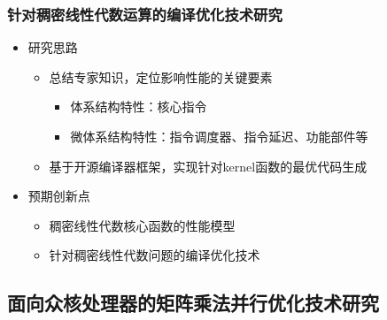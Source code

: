 \documentclass[aspectratio=169]{beamer}
\begin{document}
\begin{frame}
  \frametitle{针对稠密线性代数运算的编译优化技术研究}
  \begin{itemize}
  \item 研究思路
    \begin{itemize}
    \item 总结专家知识，定位影响性能的关键要素
      \begin{itemize}
      \item 体系结构特性：核心指令
      \item 微体系结构特性：指令调度器、指令延迟、功能部件等
      \end{itemize}
    \item 基于开源编译器框架，实现针对kernel函数的最优代码生成
    \end{itemize}
  \item 预期创新点
    \begin{itemize}
    \item 稠密线性代数核心函数的性能模型
    \item 针对稠密线性代数问题的编译优化技术
    \end{itemize}
  \end{itemize}
\end{frame}

\subsection[并行可扩展性研究]{面向众核处理器的矩阵乘法并行优化技术研究}
\end{document}
